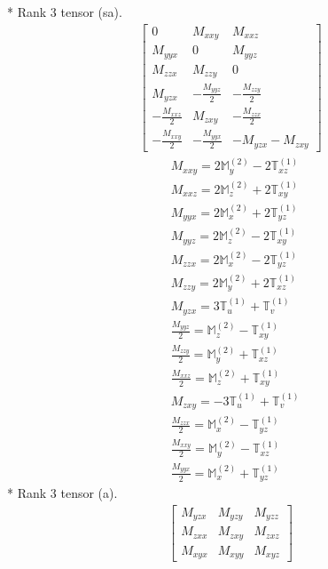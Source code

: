 \documentclass[fleqn,8pt,landscape]{jsarticle}
\begin{document}
* Rank 3 tensor (sa).
\begin{align*}
\begin{bmatrix} 0 & M_{xxy} & M_{xxz} \\ M_{yyx} & 0 & M_{yyz} \\ M_{zzx} & M_{zzy} & 0 \\ M_{yzx} & - \frac{M_{yyz}}{2} & - \frac{M_{zzy}}{2} \\ - \frac{M_{xxz}}{2} & M_{zxy} & - \frac{M_{zzx}}{2} \\ - \frac{M_{xxy}}{2} & - \frac{M_{yyx}}{2} & - M_{yzx} - M_{zxy} \end{bmatrix}
\end{align*}
\begin{align*}
& M_{xxy} = 2 \mathbb{M}_{y}^{(2)} - 2 \mathbb{T}_{xz}^{(1)} \\
& M_{xxz} = 2 \mathbb{M}_{z}^{(2)} + 2 \mathbb{T}_{xy}^{(1)} \\
& M_{yyx} = 2 \mathbb{M}_{x}^{(2)} + 2 \mathbb{T}_{yz}^{(1)} \\
& M_{yyz} = 2 \mathbb{M}_{z}^{(2)} - 2 \mathbb{T}_{xy}^{(1)} \\
& M_{zzx} = 2 \mathbb{M}_{x}^{(2)} - 2 \mathbb{T}_{yz}^{(1)} \\
& M_{zzy} = 2 \mathbb{M}_{y}^{(2)} + 2 \mathbb{T}_{xz}^{(1)} \\
& M_{yzx} = 3 \mathbb{T}_{u}^{(1)} + \mathbb{T}_{v}^{(1)} \\
& \frac{M_{yyz}}{2} = \mathbb{M}_{z}^{(2)} - \mathbb{T}_{xy}^{(1)} \\
& \frac{M_{zzy}}{2} = \mathbb{M}_{y}^{(2)} + \mathbb{T}_{xz}^{(1)} \\
& \frac{M_{xxz}}{2} = \mathbb{M}_{z}^{(2)} + \mathbb{T}_{xy}^{(1)} \\
& M_{zxy} = - 3 \mathbb{T}_{u}^{(1)} + \mathbb{T}_{v}^{(1)} \\
& \frac{M_{zzx}}{2} = \mathbb{M}_{x}^{(2)} - \mathbb{T}_{yz}^{(1)} \\
& \frac{M_{xxy}}{2} = \mathbb{M}_{y}^{(2)} - \mathbb{T}_{xz}^{(1)} \\
& \frac{M_{yyx}}{2} = \mathbb{M}_{x}^{(2)} + \mathbb{T}_{yz}^{(1)}
\end{align*}
* Rank 3 tensor (a).
\begin{align*}
\begin{bmatrix} M_{yzx} & M_{yzy} & M_{yzz} \\ M_{zxx} & M_{zxy} & M_{zxz} \\ M_{xyx} & M_{xyy} & M_{xyz} \end{bmatrix}
\end{align*}
\end{document}
